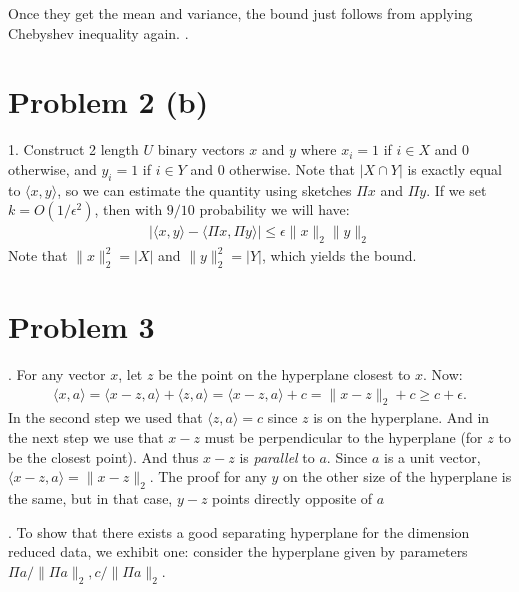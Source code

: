 \documentclass[11pt]{article}
\begin{document}
Once they get the mean and variance, the bound just follows from applying Chebyshev inequality again.
	.
	\section*{Problem 2 (b)}
	1. Construct 2 length $U$ binary vectors $x$ and $y$ where $x_i = 1$ if $i \in X$ and $0$ otherwise, and $y_i = 1$ if $i \in Y$ and $0$ otherwise. Note that $|X\cap Y|$ is exactly equal to $\langle x, y\rangle$, so we can estimate the quantity using sketches $\Pi x$ and $\Pi y$. If we set $k = O(1/\epsilon^2)$, then with $9/10$ probability we will have:
	\begin{align*}
		\left|\langle  x, y \rangle  - \langle \Pi x, \Pi y \rangle \right| \leq \epsilon \|x\|_2 \|y\|_2
	\end{align*}
Note that $\|x\|_2^2 = |X|$ and $\|y\|_2^2 = |Y|$, which yields the bound. 

\vspace{.5em}

	
	\section*{Problem 3}
	\smallskip{}.\hspace{1em}
	For any vector $x$, let $z$ be the point on the hyperplane closest to $x$. Now: 
	\begin{align*}
	\langle x, a \rangle = \langle x - z, a \rangle  + \langle z, a \rangle  = \langle x - z, a \rangle +c = \|x - z\|_2 + c \geq c + \epsilon.
	\end{align*}
In the second step we used that  $\langle z, a \rangle =c$ since $z$ is on the hyperplane. And in the next step we use that $x - z$ must be perpendicular to the hyperplane (for $z$ to be the closest point). And thus $x - z$ is \emph{parallel} to $a$. Since $a$ is a unit vector, $\langle x - z, a \rangle= \|x-z\|_2$. The proof for any $y$ on the other size of the hyperplane is the same, but in that case, $y-z$ points directly opposite of $a$
	
	\smallskip{}.\hspace{1em}	
	To show that there exists a good separating hyperplane for the dimension reduced data, we  exhibit one: consider the hyperplane given by parameters $\Pi a/\|\Pi a\|_2 , c/\|\Pi a\|_2$. 
	
\end{document}
